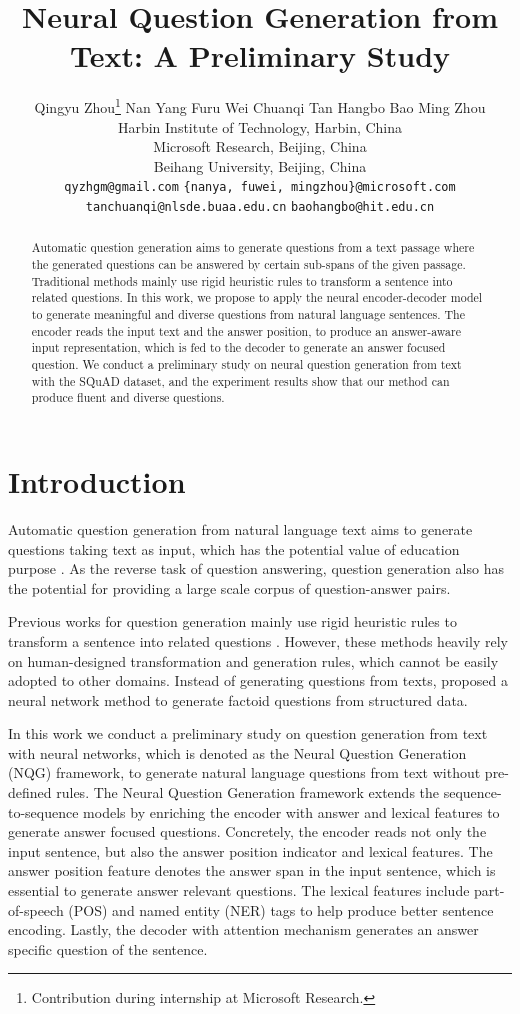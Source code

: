 \documentclass[11pt,letterpaper]{article}
\title{Neural Question Generation from Text: A Preliminary Study}
\author{Qingyu Zhou\thanks{\; Contribution during internship at Microsoft Research.} \hspace{0.15cm} Nan Yang \hspace{0.15cm} Furu Wei \hspace{0.15cm} Chuanqi Tan \hspace{0.15cm} Hangbo Bao \hspace{0.15cm} Ming Zhou \\
	Harbin Institute of Technology, Harbin, China \\
	Microsoft Research, Beijing, China \\
	Beihang University, Beijing, China\\
	{\tt qyzhgm@gmail.com} \hspace{0.15cm} {\tt \{nanya, fuwei, mingzhou\}@microsoft.com}\\
{\tt tanchuanqi@nlsde.buaa.edu.cn} \hspace{0.15cm} {\tt baohangbo@hit.edu.cn}
}
\date{}
\begin{document}
\maketitle

\begin{abstract}
	Automatic question generation aims to generate questions from a text passage where the generated questions can be answered by certain sub-spans of the given passage.
	Traditional methods mainly use rigid heuristic rules to transform a sentence into related questions.
	In this work, we propose to apply the neural encoder-decoder model to generate meaningful and diverse questions from natural language sentences.
	The encoder reads the input text and the answer position, to produce an answer-aware input representation, which is fed to the decoder to generate an answer focused question.
	We conduct a preliminary study on neural question generation from text with the SQuAD dataset, and the experiment results show that our method can produce fluent and diverse questions.
\end{abstract}

\section{Introduction}

Automatic question generation  from natural language text aims to generate questions taking text as input, which has the potential value of education purpose \citep{heilman2011automatic}.
As the reverse task of question answering, question generation also has the potential for providing a large scale corpus of question-answer pairs.

Previous works for question generation mainly use rigid heuristic rules to transform a sentence into related questions \citep{heilman2011automatic, chali2015towards}.
However, these methods heavily rely on human-designed transformation and generation rules, which cannot be easily adopted to other domains.
Instead of generating questions from texts, \citet{serban-EtAl:2016:P16-1} proposed a neural network method to generate factoid questions from structured data.

In this work we conduct a preliminary study on question generation from text with neural networks, which is denoted as the Neural Question Generation  (NQG) framework, to generate natural language questions from text without pre-defined rules.
The Neural Question Generation framework extends the sequence-to-sequence models by enriching the encoder with answer and lexical  features to generate answer focused questions.
Concretely, the encoder reads not only the input sentence, but also the answer position indicator and lexical features.
The answer position feature denotes the answer span in the input sentence, which is essential to generate answer relevant questions.
The lexical features include part-of-speech (POS) and named entity (NER) tags to help produce better sentence encoding.
Lastly, the decoder with attention mechanism \cite{bahdanau2014neural} generates an answer specific question of the sentence.
\end{document}
